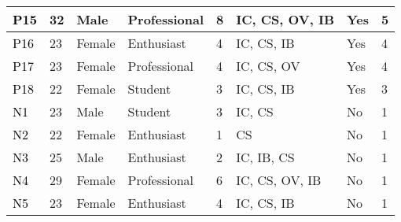 \begin{table*}
\begin{tabular}{|p{0.8cm}|p{0.8cm}|p{1.1cm}|p{1.7cm}|p{2.2cm}|p{2cm}|p{1.1cm}|p{2.5cm}|}
\textcolor{black}{P15} & 32  & Male   & Professional & 8             & IC, CS, OV, IB & Yes    & 5                 \\ \hline
\textcolor{black}{P16} & 23  & Female & Enthusiast   & 4             & IC, CS, IB     & Yes    & 4                 \\ \hline
\textcolor{black}{P17} & 23  & Female & Professional & 4             & IC, CS, OV     & Yes    & 4                 \\ \hline
\textcolor{black}{P18} & 22  & Female & Student      & 3             & IC, CS, IB     & Yes    & 3                 \\ \hline
\textcolor{black}{N1}  & 23  & Male   & Student      & 3             & IC, CS         & No     & 1                 \\ \hline
\textcolor{black}{N2}  & 22  & Female & Enthusiast   & 1             & CS             & No     & 1                 \\ \hline
\textcolor{black}{N3}  & 25  & Male   & Enthusiast   & 2             & IC, IB, CS     & No     & 1                 \\ \hline
\textcolor{black}{N4}  & 29  & Female & Professional & 6             & IC, CS, OV, IB & No     & 1                 \\ \hline
\textcolor{black}{N5}  & 23  & Female & Enthusiast   & 4             & IC, CS, IB     & No     & 1                 \\ \hline
\end{tabular}
    \label{tab:participants}
\end{table*}
